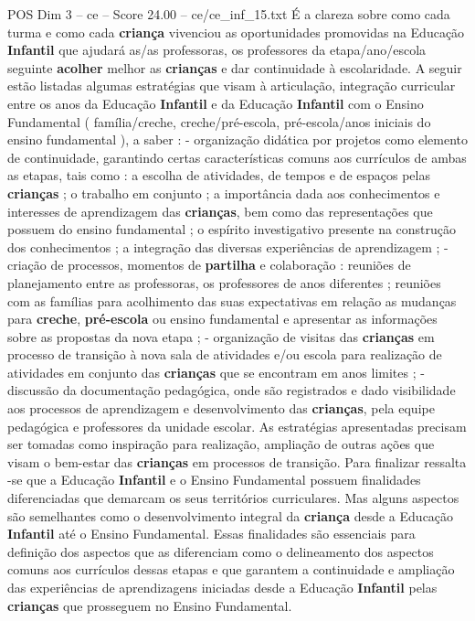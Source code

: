 \begin{textsample}{POS Dim 3 – ce – Score 24.00 – ce/ce\_inf\_15.txt}
É a clareza sobre como cada turma e como cada \textbf{criança} vivenciou as oportunidades promovidas na Educação \textbf{Infantil} que ajudará as/as professoras, os professores da etapa/ano/escola seguinte \textbf{acolher} melhor as \textbf{crianças} e dar continuidade à escolaridade.
A seguir estão listadas algumas estratégias que visam à articulação, integração curricular entre os anos da Educação \textbf{Infantil} e da Educação \textbf{Infantil} com o Ensino Fundamental ( família/creche, creche/pré-escola, pré-escola/anos iniciais do ensino fundamental ), a saber : - organização didática por projetos como elemento de continuidade, garantindo certas características comuns aos currículos de ambas as etapas, tais como : a escolha de atividades, de tempos e de espaços pelas \textbf{crianças} ; o trabalho em conjunto ; a importância dada aos conhecimentos e interesses de aprendizagem das \textbf{crianças}, bem como das representações que possuem do ensino fundamental ; o espírito investigativo presente na construção dos conhecimentos ; a integração das diversas experiências de aprendizagem ; - criação de processos, momentos de \textbf{partilha} e colaboração : reuniões de planejamento entre as professoras, os professores de anos diferentes ; reuniões com as famílias para acolhimento das suas expectativas em relação as mudanças para \textbf{creche}, \textbf{pré-escola} ou ensino fundamental e apresentar as informações sobre as propostas da nova etapa ; - organização de visitas das \textbf{crianças} em processo de transição à nova sala de atividades e/ou escola para realização de atividades em conjunto das \textbf{crianças} que se encontram em anos limites ; - discussão da documentação pedagógica, onde são registrados e dado visibilidade aos processos de aprendizagem e desenvolvimento das \textbf{crianças}, pela equipe pedagógica e professores da unidade escolar.
As estratégias apresentadas precisam ser tomadas como inspiração para realização, ampliação de outras ações que visam o bem-estar das \textbf{crianças} em processos de transição.
Para finalizar ressalta -se que a Educação \textbf{Infantil} e o Ensino Fundamental possuem finalidades diferenciadas que demarcam os seus territórios curriculares.
Mas alguns aspectos são semelhantes como o desenvolvimento integral da \textbf{criança} desde a Educação \textbf{Infantil} até o Ensino Fundamental.
Essas finalidades são essenciais para definição dos aspectos que as diferenciam como o delineamento dos aspectos comuns aos currículos dessas etapas e que garantem a continuidade e ampliação das experiências de aprendizagens iniciadas desde a Educação \textbf{Infantil} pelas \textbf{crianças} que prosseguem no Ensino Fundamental.

\end{textsample}
